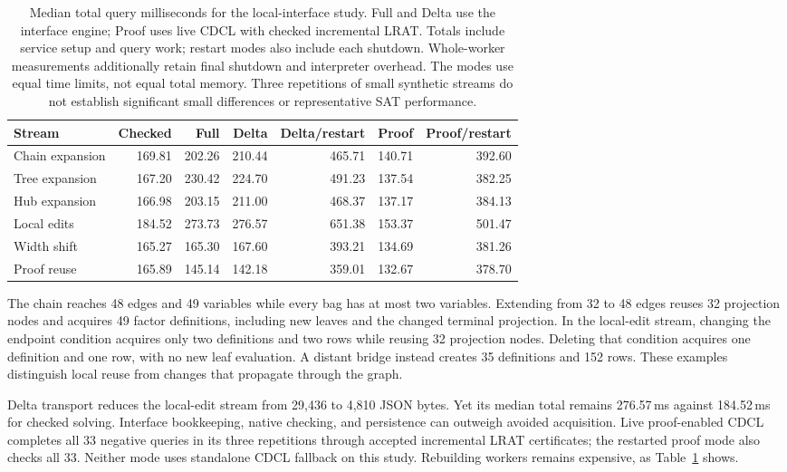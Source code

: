 \documentclass[11pt,a4paper]{article}
\numberwithin{equation}{section}
\theoremstyle{plain}
\theoremstyle{definition}
\theoremstyle{remark}
\begin{document}
\begin{table}[b]
\centering
\small
\setlength{\tabcolsep}{4pt}
\begin{tabular}{lrrrrrr}
\toprule
Stream & Checked & Full & Delta & Delta/restart & Proof & Proof/restart \\
\midrule
Chain expansion & 169.81 & 202.26 & 210.44 & 465.71 & 140.71 & 392.60 \\
Tree expansion & 167.20 & 230.42 & 224.70 & 491.23 & 137.54 & 382.25 \\
Hub expansion & 166.98 & 203.15 & 211.00 & 468.37 & 137.17 & 384.13 \\
Local edits & 184.52 & 273.73 & 276.57 & 651.38 & 153.37 & 501.47 \\
Width shift & 165.27 & 165.30 & 167.60 & 393.21 & 134.69 & 381.26 \\
Proof reuse & 165.89 & 145.14 & 142.18 & 359.01 & 132.67 & 378.70 \\
\bottomrule
\end{tabular}
\caption{Median total query milliseconds for the local-interface study. Full and Delta use the interface engine; Proof uses live CDCL with checked incremental LRAT. Totals include service setup and query work; restart modes also include each shutdown. Whole-worker measurements additionally retain final shutdown and interpreter overhead. The modes use equal time limits, not equal total memory. Three repetitions of small synthetic streams do not establish significant small differences or representative SAT performance.}
\label{tab:interface-study}
\end{table}

The chain reaches 48 edges and 49 variables while every bag has at most two variables. Extending from 32 to 48 edges reuses 32 projection nodes and acquires 49 factor definitions, including new leaves and the changed terminal projection. In the local-edit stream, changing the endpoint condition acquires only two definitions and two rows while reusing 32 projection nodes. Deleting that condition acquires one definition and one row, with no new leaf evaluation. A distant bridge instead creates 35 definitions and 152 rows. These examples distinguish local reuse from changes that propagate through the graph.

Delta transport reduces the local-edit stream from 29,436 to 4,810 JSON bytes. Yet its median total remains 276.57\,ms against 184.52\,ms for checked solving. Interface bookkeeping, native checking, and persistence can outweigh avoided acquisition. Live proof-enabled CDCL completes all 33 negative queries in its three repetitions through accepted incremental LRAT certificates; the restarted proof mode also checks all 33. Neither mode uses standalone CDCL fallback on this study. Rebuilding workers remains expensive, as Table~\ref{tab:interface-study} shows.
\end{document}
